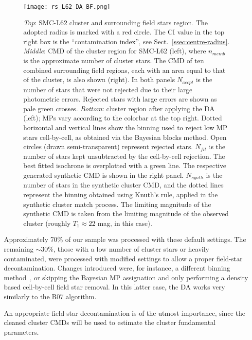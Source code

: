 \documentclass{aa}
\begin{document}
\begin{figure}
\centering
\texttt{[image: rs\_L62\_DA\_BF.png]}
\caption{\emph{Top}: SMC-L62 cluster and surrounding field stars
region. The adopted radius is marked with a red circle. The CI value in the top
right box is the ``contamination index'', see Sect.~\ref{ssec:centre-radius}.
%
\emph{Middle}: CMD of the cluster region for SMC-L62 (left),
where $n_{memb}$ is the approximate number of cluster stars. The CMD
of ten combined surrounding field regions, each with an area equal to
that of the cluster, is also shown (right).
In both panels $N_{accpt}$ is the number of stars that were not rejected due to
their large photometric errors. Rejected stars with large errors are shown as
pale green crosses.
%
\emph{Bottom}: cluster region after applying the DA (left); MPs vary
according to the colorbar at the top right. Dotted horizontal and vertical lines
show the binning used to reject low MP stars cell-by-cell, as obtained via the
Bayesian blocks method. Open circles (drawn semi-transparent) represent rejected
stars.
$N_{fit}$ is the number of stars kept unsubtracted by the cell-by-cell
rejection. The best fitted isochrone is overplotted with a green line. 
The respective generated synthetic CMD is shown in the right panel. $N_{synth}$
is the number of stars in the synthetic cluster CMD, and the dotted lines
represent the binning obtained using Knuth's rule, applied in the synthetic
cluster match process. The limiting magnitude of the synthetic CMD is
taken from the limiting magnitude of the observed cluster (roughly
$T_1{\approx}22$ mag, in this case).}
\label{fig:DA_BF}
\end{figure}

Approximately 70\% of our sample was processed with these default settings.
The remaining ${\sim}$30\%, those with a low number of cluster stars
or heavily contaminated, were processed with modified settings to allow a proper
field-star decontamination.
Changes introduced were, for instance, a different binning
method~\citep[often a rectangular grid using Scott's rule,][]{Scott_1979},
or skipping the Bayesian MP assignation and only performing a density based
cell-by-cell field star removal. In this latter case, the DA works very
similarly to the B07 algorithm.

An appropriate field-star decontamination is of the utmost importance, since the
cleaned cluster CMDs will be used to estimate the cluster fundamental parameters.


\end{document}
